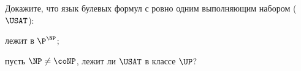 Докажите, что язык булевых формул с ровно одним выполняющим набором ($\USAT$):
\begin{enumcyr}
    \item лежит в $\P^{\NP}$;
    \item пусть $\NP \neq \coNP$, лежит ли $\USAT$ в классе $\UP$?
\end{enumcyr}